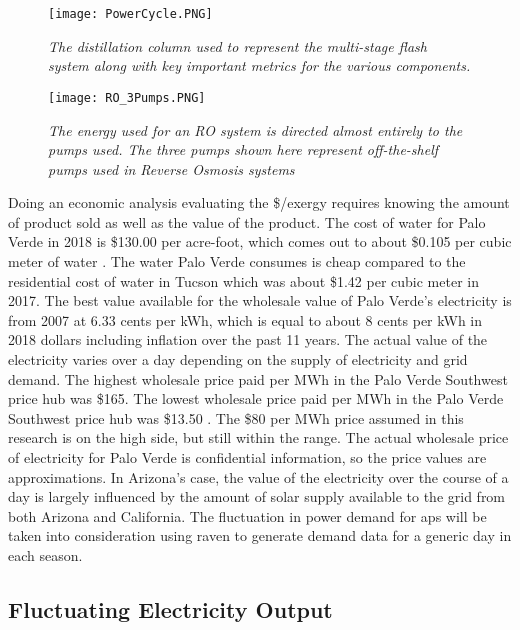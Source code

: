 \begin{figure*}[h!]
\centering
\texttt{[image: PowerCycle.PNG]}
\caption{\small \sl The distillation column used to represent the multi-stage flash system along with key important metrics for the various components.}
\label{MSF}
\centering
\end{figure*}

\begin{figure*}[h!]
\centering
\texttt{[image: RO\_3Pumps.PNG]}
\caption{\small \sl The energy used for an RO system is directed almost entirely to the pumps used.  The three pumps shown here represent off-the-shelf pumps used in Reverse Osmosis systems}
\label{RO}
\centering
\end{figure*}

Doing an economic analysis evaluating the \$/exergy requires knowing the amount of product sold as well as the value of the product. The cost of water for Palo Verde in 2018 is \$130.00 per acre-foot, which comes out to about \$0.105 per cubic meter of water \cite{Brown2018}. The water Palo Verde consumes is cheap compared to the residential cost of water in Tucson which was about \$1.42 per cubic meter in 2017\cite{CityofTucson2017}. The best value available for the wholesale value of Palo Verde's electricity is from 2007 at 6.33 cents per kWh, which is equal to about 8 cents per kWh in 2018 dollars including inflation over the past 11 years. The actual value of the electricity varies over a day depending on the supply of electricity and grid demand. The highest wholesale price paid per MWh in the Palo Verde Southwest price hub was \$165.  The lowest wholesale price paid per MWh in the Palo Verde Southwest price hub was \$13.50 \cite{EIA2017}.  The \$80 per MWh price assumed in this research is on the high side, but still within the range.  The actual wholesale price of electricity for Palo Verde is confidential information, so the price values are approximations.  In Arizona's case, the value of the electricity over the course of a day is largely influenced by the amount of solar supply available to the grid from both Arizona and California. The fluctuation in power demand for \ac{aps} will be taken into consideration using \ac{raven} to generate demand data for a generic day in each season.

\subsection{Fluctuating Electricity Output}

